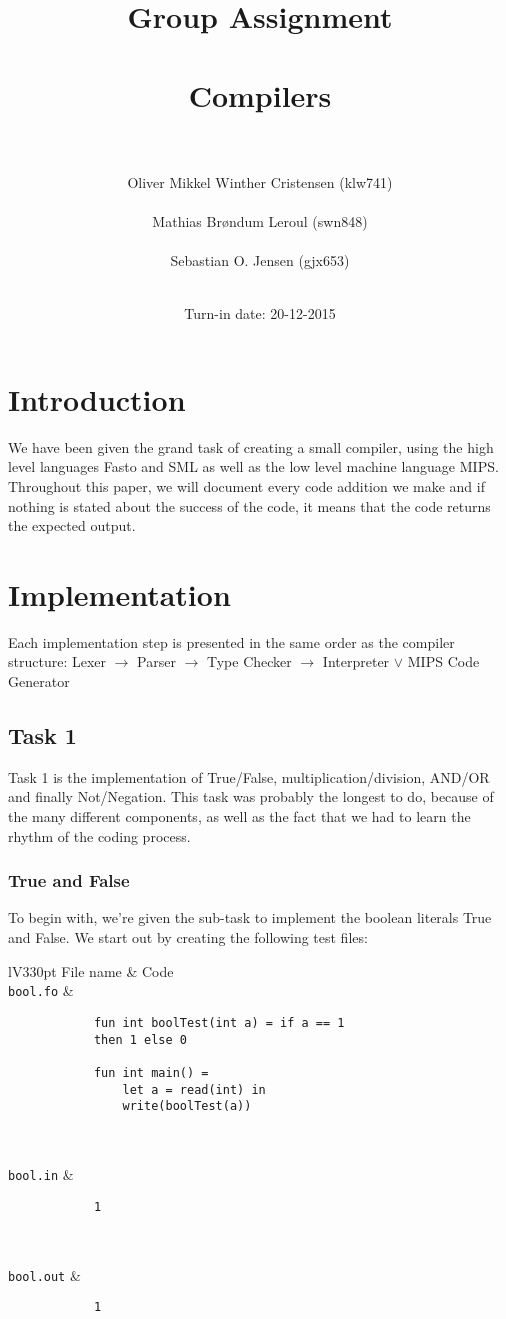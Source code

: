 \documentclass[a4paper]{article}
\title{Group Assignment\\ \ \\Compilers\\ \ \\}
\author{Oliver Mikkel Winther Cristensen (klw741) \\ \ \\Mathias Brøndum Leroul (swn848)\\ \ \\Sebastian O. Jensen (gjx653)\\ \ \\}
\date{Turn-in date: 20-12-2015}
\newcommand{\command}[1]{\texttt{\string#1}}
\begin{document}
\maketitle
\newpage

\tableofcontents
\newpage

\section{Introduction}
	We have been given the grand task of creating a small compiler, using the high level languages Fasto and SML as well as the low level machine language MIPS. Throughout this paper, we will document every code addition we make and if nothing is stated about the success of the code, it means that the code returns the expected output.
	
\section{Implementation}
	Each implementation step is presented in the same order as the compiler structure: Lexer $\rightarrow$ Parser $\rightarrow$ Type Checker $\rightarrow$ Interpreter $\vee$ MIPS Code Generator
\subsection{Task 1}
	Task 1 is the implementation of True/False, multiplication/division, AND/OR and finally Not/Negation. This task was probably the longest to do, because of the many different components, as well as the fact that we had to learn the rhythm of the coding process.
	
\subsubsection{True and False}

	To begin with, we're given the sub-task to implement the boolean literals True and False. We start out by creating the following test files:
	
\begin{center}	
	\begin{tabular}{lV{330pt}}
		\toprule
		File name & Code\\
		\midrule
		\command{bool.fo} &
		\begin{verbatim}
			fun int boolTest(int a) = if a == 1
			then 1 else 0
			
			fun int main() =
			    let a = read(int) in
			    write(boolTest(a))
			  
		\end{verbatim}
		\\
		\command{bool.in} &
		\begin{verbatim}
			1
			
		\end{verbatim}
		\\
		\command{bool.out} &
		\begin{verbatim}
			1
		\end{verbatim}
		\\
		\bottomrule \\
	\end{tabular}
\end{center}
\end{document}
